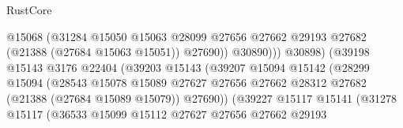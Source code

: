 \begin{lexlean}{RustCore}
\begin{coremodule}
                                                  @15068
                                                  (@31284
                                                    @15050
                                                    @15063
                                                    @28099
                                                    @27656
                                                    @27662
                                                    @29193
                                                    @27682
                                                    (@21388 (@27684 @15063 @15051))
                                                    @27690))
                                                @30890)))
                                          @30898)
                                        (@39198
                                          @15143
                                          @3176
                                          @22404
                                          (@39203
                                            @15143
                                            (@39207
                                              @15094
                                              @15142
                                              (@28299
                                                @15094
                                                (@28543
                                                  @15078
                                                  @15089
                                                  @27627
                                                  @27656
                                                  @27662
                                                  @28312
                                                  @27682
                                                  (@21388 (@27684 @15089 @15079))
                                                  @27690))
                                              (@39227
                                                @15117
                                                @15141
                                                (@31278
                                                  @15117
                                                  (@36533
                                                    @15099
                                                    @15112
                                                    @27627
                                                    @27656
                                                    @27662
                                                    @29193

\end{coremodule}
\end{lexlean}
